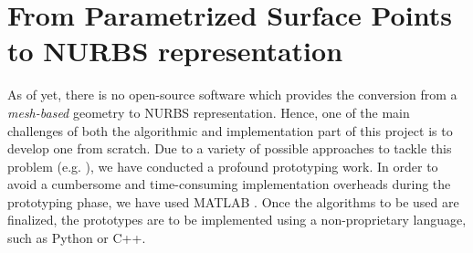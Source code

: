 \section{From Parametrized Surface Points to NURBS representation}
As of yet, there is no open-source software which provides the conversion from a \textit{mesh-based} geometry to NURBS representation. Hence, one of the main challenges of both the algorithmic and implementation part of this project is to develop one from scratch. Due to a variety of possible approaches to tackle this problem (e.g. \cite{ eck1996automatic, becker2011advanced}), we have conducted a profound prototyping work. In order to avoid a cumbersome and time-consuming implementation overheads during the prototyping phase, we have used MATLAB \cite{MATLAB}. Once the algorithms to be used are finalized, the prototypes are to be implemented using a non-proprietary language, such as Python or C++.




